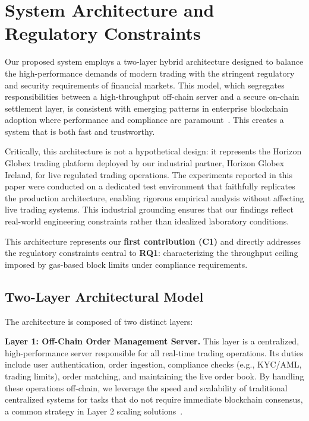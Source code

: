 \section{System Architecture and Regulatory Constraints}
\label{sec:architecture}

Our proposed system employs a two-layer hybrid architecture designed to balance the high-performance demands of modern trading with the stringent regulatory and security requirements of financial markets. This model, which segregates responsibilities between a high-throughput off-chain server and a secure on-chain settlement layer, is consistent with emerging patterns in enterprise blockchain adoption where performance and compliance are paramount~\cite{jamithireddy2025hybrid}. This creates a system that is both fast and trustworthy.

Critically, this architecture is not a hypothetical design: it represents the Horizon Globex trading platform deployed by our industrial partner, Horizon Globex Ireland, for live regulated trading operations. The experiments reported in this paper were conducted on a dedicated test environment that faithfully replicates the production architecture, enabling rigorous empirical analysis without affecting live trading systems. This industrial grounding ensures that our findings reflect real-world engineering constraints rather than idealized laboratory conditions.

This architecture represents our \textbf{first contribution (C1)} and directly addresses the regulatory constraints central to \textbf{RQ1}: characterizing the throughput ceiling imposed by gas-based block limits under compliance requirements.

\subsection{Two-Layer Architectural Model}

The architecture is composed of two distinct layers:

\textbf{Layer 1: Off-Chain Order Management Server.} This layer is a centralized, high-performance server responsible for all real-time trading operations. Its duties include user authentication, order ingestion, compliance checks (e.g., KYC/AML, trading limits), order matching, and maintaining the live order book. By handling these operations off-chain, we leverage the speed and scalability of traditional centralized systems for tasks that do not require immediate blockchain consensus, a common strategy in Layer 2 scaling solutions~\cite{rahouti2018bitcoin}.

